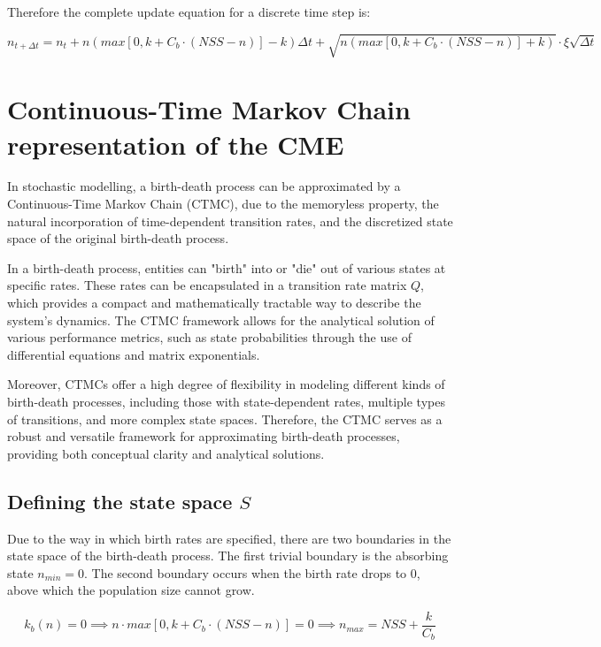 \documentclass[]{article}
\begin{document}
Therefore the complete update equation for a discrete time step is:

\begin{equation} \label{eq:EM_update} 
	n_{t + \Delta t} = n_t + n (max[0, k + C_b \cdot (NSS-n)] - k)\Delta t + \sqrt{n(max[0, k + C_b \cdot (NSS-n)] + k)} \cdot \xi \sqrt{\Delta t} 	
\end{equation}


\section{ Continuous-Time Markov Chain representation of the CME}

In stochastic modelling, a birth-death process can be approximated by a Continuous-Time Markov Chain (CTMC), due to the memoryless property, the natural incorporation of time-dependent transition rates, and the discretized state space of the original birth-death process. 

In a birth-death process, entities can "birth" into or "die" out of various states at specific rates. These rates can be encapsulated in a transition rate matrix \( Q \), which provides a compact and mathematically tractable way to describe the system's dynamics. The CTMC framework allows for the analytical solution of various performance metrics, such as state probabilities through the use of differential equations and matrix exponentials.

Moreover, CTMCs offer a high degree of flexibility in modeling different kinds of birth-death processes, including those with state-dependent rates, multiple types of transitions, and more complex state spaces. Therefore, the CTMC serves as a robust and versatile framework for approximating birth-death processes, providing both conceptual clarity and analytical solutions.

\subsection{Defining the state space $S$}

Due to the way in which birth rates are specified, there are two boundaries in the state space of the birth-death process. The first trivial boundary is the absorbing state $n_{min} = 0$. The second boundary occurs when the birth rate drops to 0, above which the population size cannot grow.

\begin{equation}
	k_b(n) = 0 \implies n \cdot max[0, k + C_b \cdot (NSS-n)] = 0 \implies n_{max} = NSS + \frac{k}{C_b}
\end{equation}
\end{document}
